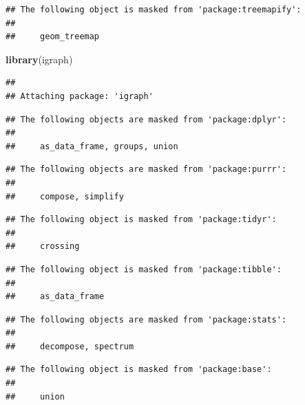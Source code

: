 \documentclass[]{krantz}
\makeatletter
\newenvironment{Shaded}{\begin{snugshade}}{\end{snugshade}}
\newcommand{\KeywordTok}[1]{\textcolor[rgb]{0.13,0.29,0.53}{\textbf{#1}}}
\newcommand{\NormalTok}[1]{#1}
\newenvironment{kframe}{%
\medskip{}
\setlength{\fboxsep}{.8em}
 \def\at@end@of@kframe{}%
 \ifinner\ifhmode%
  \def\at@end@of@kframe{\end{minipage}}%
  \begin{minipage}{\columnwidth}%
 \fi\fi%
 \def\FrameCommand##1{\hskip\@totalleftmargin \hskip-\fboxsep
 \colorbox{shadecolor}{##1}\hskip-\fboxsep
     \hskip-\linewidth \hskip-\@totalleftmargin \hskip\columnwidth}%
 \MakeFramed {\advance\hsize-\width
   \@totalleftmargin\z@ \linewidth\hsize
   \@setminipage}}%
 {\par\unskip\endMakeFramed%
 \at@end@of@kframe}
\renewenvironment{Shaded}{\begin{kframe}}{\end{kframe}}
\makeatother
\begin{document}
\begin{verbatim}
## The following object is masked from 'package:treemapify':
## 
##     geom_treemap
\end{verbatim}

\begin{Shaded}
\begin{Highlighting}[]
\KeywordTok{library}\NormalTok{(igraph)}
\end{Highlighting}
\end{Shaded}

\begin{verbatim}
## 
## Attaching package: 'igraph'
\end{verbatim}

\begin{verbatim}
## The following objects are masked from 'package:dplyr':
## 
##     as_data_frame, groups, union
\end{verbatim}

\begin{verbatim}
## The following objects are masked from 'package:purrr':
## 
##     compose, simplify
\end{verbatim}

\begin{verbatim}
## The following object is masked from 'package:tidyr':
## 
##     crossing
\end{verbatim}

\begin{verbatim}
## The following object is masked from 'package:tibble':
## 
##     as_data_frame
\end{verbatim}

\begin{verbatim}
## The following objects are masked from 'package:stats':
## 
##     decompose, spectrum
\end{verbatim}

\begin{verbatim}
## The following object is masked from 'package:base':
## 
##     union
\end{verbatim}
\end{document}
